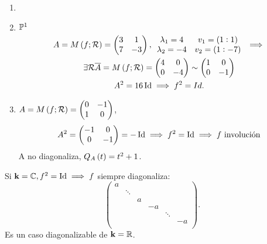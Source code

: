 \begin{example}[(Involuciones)]
	\begin{enumerate}
		\item[]
		\item $\mathbb{P}^1$ \\
			\begin{gather*}
			A = M\left( f; \mathcal{R}\right) =
			\begin{pmatrix}
				3 & 1 \\
				7 & -3
			\end{pmatrix}, \begin{array}{cc}
				\lambda_1 = 4 & v_1 = (1:1) \\
				\lambda_2 = -4 & v_2 = (1:-7)
			\end{array} \implies \\
			\exists\mathcal{R} \overline{A} = M\left( f; \mathcal{R}\right) =
			\begin{pmatrix}
				4 & 0 \\
				0 & -4
			\end{pmatrix} \sim
			\begin{pmatrix}
				1 & 0 \\
				0 & -1
			\end{pmatrix} \\
			A^2 = 16\operatorname{Id} \implies f^2 = Id.
		\end{gather*}
		\item $A = M\left( f;\mathcal{R}\right) =
		\begin{pmatrix}
			0 & -1 \\
			1 & 0
		\end{pmatrix}$,
		\[
			A^2 = \begin{pmatrix}
				-1 & 0 \\
				0 & -1
			\end{pmatrix}
			= -\operatorname{Id} \implies f^2 = \operatorname{Id} \implies f\text{ involución}
		\]
		A no diagonaliza, $Q_A \left( t\right) = t^2+1$.
	\end{enumerate}
\end{example}
\begin{obs}
	Si $\mathbf{k} = \mathbb{C}, f^2 = \operatorname{Id} \implies f$ siempre diagonaliza:
	\[
		\begin{pmatrix}
			a & & & & & \\
			& \ddots & & & & \\
			& & a & & & \\
			& & & -a & & \\
			& & & & \ddots & \\
			& & & & & -a \\
		\end{pmatrix}.
	\]
	Es un caso diagonalizable de $\mathbf{k} = \mathbb{R}$.
\end{obs}

